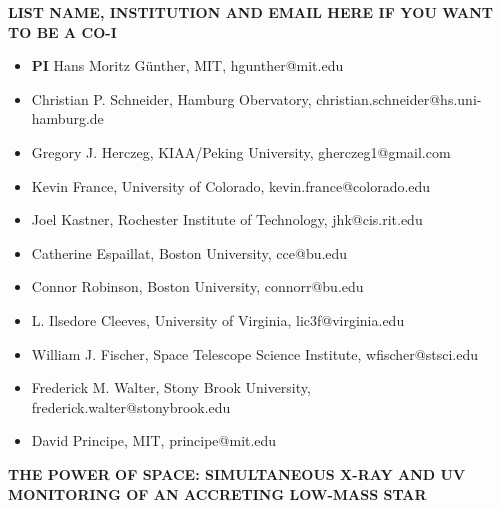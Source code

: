 \documentclass[letterpaper,11pt,twocolumn]{article}
\begin{document}
\onecolumn
\begin{center} 
\bfseries\uppercase{%
List name, institution and email here if you want to be a Co-I
}
\end{center}
\begin{itemize}
    \item \textbf{PI} Hans Moritz G\"unther, MIT, hgunther@mit.edu
    \item Christian P. Schneider, Hamburg Obervatory, christian.schneider@hs.uni-hamburg.de
\item Gregory J. Herczeg, KIAA/Peking University, gherczeg1@gmail.com
\item Kevin France, University of Colorado, kevin.france@colorado.edu
\item Joel Kastner, Rochester Institute of Technology, jhk@cis.rit.edu
\item Catherine Espaillat, Boston University, cce@bu.edu
\item Connor Robinson, Boston University, connorr@bu.edu
\item L. Ilsedore Cleeves, University of Virginia, lic3f@virginia.edu
\item William J. Fischer, Space Telescope Science Institute, wfischer@stsci.edu
\item Frederick M. Walter, Stony Brook University, frederick.walter@stonybrook.edu
\item David Principe, MIT, principe@mit.edu
\end{itemize}

\twocolumn


\pagestyle{plain}


 

\begin{center} 
\bfseries\uppercase{%
The power of space: Simultaneous X-ray and UV monitoring of an accreting
low-mass star
}
\end{center}



\end{document}
